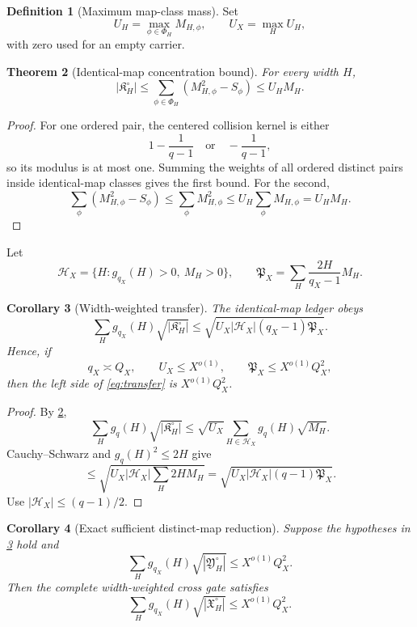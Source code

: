 \documentclass[11pt]{article}
\newtheorem{theorem}{Theorem}[section]
\newtheorem{corollary}[theorem]{Corollary}
\theoremstyle{definition}
\newtheorem{definition}[theorem]{Definition}
\theoremstyle{remark}
\newcommand{\PX}{\mathfrak P_X}
\begin{document}
\begin{definition}[Maximum map-class mass]
\label{def:U}
Set
\[
 U_H=\max_{\phi\in\Phi_H}M_{H,\phi},
\qquad
 U_X=\max_HU_H,
\]
with zero used for an empty carrier.
\end{definition}

\begin{theorem}[Identical-map concentration bound]
\label{thm:K-bound}
For every width \(H\),
\begin{equation}
 \boxed{
 |\mathfrak K_H^\circ|
 \le
 \sum_{\phi\in\Phi_H}
 \left(M_{H,\phi}^2-S_\phi\right)
 \le U_HM_H.}
\label{eq:K-bound}
\end{equation}
\end{theorem}

\begin{proof}
For one ordered pair, the centered collision kernel is either
\[
 1-\frac1{q-1}
 \quad\text{or}\quad
 -\frac1{q-1},
\]
so its modulus is at most one.  Summing the weights of all ordered
distinct pairs inside identical-map classes gives the first bound.
For the second,
\[
 \sum_\phi(M_{H,\phi}^2-S_\phi)
 \le\sum_\phi M_{H,\phi}^2
 \le U_H\sum_\phi M_{H,\phi}
 =U_HM_H.
\]
\end{proof}

Let
\[
 \mathcal H_X=
 \{H:g_{q_X}(H)>0,\ M_H>0\},
\qquad
 \PX=\sum_H\frac{2H}{q_X-1}M_H.
\]

\begin{corollary}[Width-weighted transfer]
\label{cor:transfer}
The identical-map ledger obeys
\begin{equation}
 \boxed{
 \sum_Hg_{q_X}(H)
 \sqrt{|\mathfrak K_H^\circ|}
 \le
 \sqrt{
 U_X|\mathcal H_X|(q_X-1)\PX}.}
\label{eq:transfer}
\end{equation}
Hence, if
\[
 q_X\asymp Q_X,\qquad
 U_X\le X^{o(1)},\qquad
 \PX\le X^{o(1)}Q_X^2,
\]
then the left side of \eqref{eq:transfer} is
\(X^{o(1)}Q_X^2\).
\end{corollary}

\begin{proof}
By \cref{thm:K-bound},
\[
 \sum_Hg_q(H)\sqrt{|\mathfrak K_H^\circ|}
 \le
 \sqrt{U_X}\sum_{H\in\mathcal H_X}
 g_q(H)\sqrt{M_H}.
\]
Cauchy--Schwarz and \(g_q(H)^2\le2H\) give
\[
 \le
 \sqrt{
 U_X|\mathcal H_X|
 \sum_H2HM_H}
 =
 \sqrt{
 U_X|\mathcal H_X|(q-1)\PX}.
\]
Use \(|\mathcal H_X|\le(q-1)/2\).
\end{proof}

\begin{corollary}[Exact sufficient distinct-map reduction]
\label{cor:distinct}
Suppose the hypotheses in \cref{cor:transfer} hold and
\begin{equation}
 \sum_Hg_{q_X}(H)
 \sqrt{|\mathfrak Y_H^\circ|}
 \le X^{o(1)}Q_X^2.
\label{eq:distinct-target}
\end{equation}
Then the complete width-weighted cross gate satisfies
\[
 \sum_Hg_{q_X}(H)
 \sqrt{|\mathfrak X_H^\circ|}
 \le X^{o(1)}Q_X^2.
\]
\end{corollary}
\end{document}
